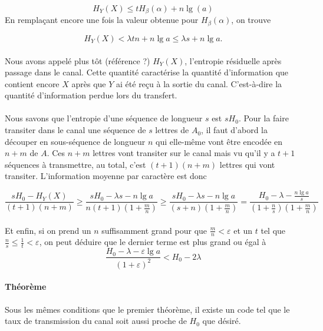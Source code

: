	\[H_Y(X)\le t H_\beta(\alpha) + n \lg(a)\]
	En remplaçant encore une fois la valeur obtenue pour $H_\beta(\alpha)$, on trouve
	
	\[H_Y(X)<\lambda t n + n \lg a \le \lambda s+n \lg a.\]
	
	\paragraph{}
	Nous avons appelé plus tôt (référence ?) $H_Y(X)$, l'entropie résiduelle après passage dans le canal. Cette quantité caractérise la quantité d'information
	que contient encore $X$ après que $Y$ ai été reçu à la sortie du canal. C'est-à-dire la quantité d'information perdue lors du transfert.
	
	\paragraph{}
	Nous savons que l'entropie d'une séquence de longueur $s$ est $sH_0$. Pour la faire transiter dans le canal une séquence de $s$ lettres de $A_0$, il faut d'abord la découper en sous-séquence de 
	longueur $n$ qui elle-même vont être encodée en $n+m$ de $A$. Ces $n+m$ lettres vont transiter sur le canal mais vu qu'il y a $t+1$ séquences à transmettre,
	au total, c'est $(t+1)(n+m)$ lettres qui vont transiter. L'information moyenne par caractère est donc
	
	\[\frac{sH_0-H_Y(X)}{(t+1)(n+m)} \ge \frac{sH_0-\lambda s-n\lg a}{n(t+1)(1+\frac{m}{n})} \ge 
	\frac{sH_0-\lambda s-n\lg a}{(s+n)(1+\frac{m}{n})} = \frac{H_0-\lambda-\frac{n\lg a}{s}}{(1+\frac{n}{s})(1+\frac{m}{n})}\]
	
	\paragraph{}
	Et enfin, si on prend un $n$ suffisamment grand pour que $\frac{m}{n}<\varepsilon$ et un $t$ tel que $\frac{n}{s} \le \frac{1}{t} < \varepsilon$, on peut 
	déduire que le dernier terme est plus grand ou égal à
	\[\frac{H_0-\lambda-\varepsilon\lg a}{(1+\varepsilon)^2}<H_0-2\lambda\]
	
	
	
	
	
	
	
	
	\paragraph{Théorème}
	Sous les mêmes conditions que le premier théorème, il existe un code tel que le taux de transmission du canal soit aussi proche de $H_0$ que désiré.

